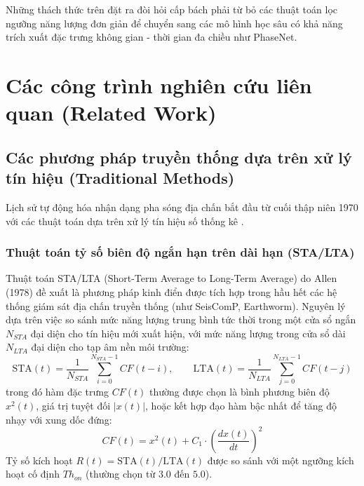 \documentclass[preprint,1p]{elsarticle}
\begin{document}
Những thách thức trên đặt ra đòi hỏi cấp bách phải từ bỏ các thuật toán lọc ngưỡng năng lượng đơn giản để chuyển sang các mô hình học sâu có khả năng trích xuất đặc trưng không gian - thời gian đa chiều như PhaseNet.

\section{Các công trình nghiên cứu liên quan (Related Work)}
\label{sec:related}

\subsection{Các phương pháp truyền thống dựa trên xử lý tín hiệu (Traditional Methods)}
\label{sec:related_trad}

Lịch sử tự động hóa nhận dạng pha sóng địa chấn bắt đầu từ cuối thập niên 1970 với các thuật toán dựa trên xử lý tín hiệu số thống kê \cite{allen1978automatic,baer1987automatic}.

\subsubsection{Thuật toán tỷ số biên độ ngắn hạn trên dài hạn (STA/LTA)}
Thuật toán STA/LTA (Short-Term Average to Long-Term Average) do Allen (1978) đề xuất \cite{allen1978automatic} là phương pháp kinh điển được tích hợp trong hầu hết các hệ thống giám sát địa chấn truyền thống (như SeisComP, Earthworm). Nguyên lý dựa trên việc so sánh mức năng lượng trung bình tức thời trong một cửa sổ ngắn $N_{STA}$ đại diện cho tín hiệu mới xuất hiện, với mức năng lượng trong cửa sổ dài $N_{LTA}$ đại diện cho tạp âm nền môi trường:
\begin{equation}
\text{STA}(t) = \frac{1}{N_{STA}} \sum_{i=0}^{N_{STA}-1} CF(t - i), \qquad \text{LTA}(t) = \frac{1}{N_{LTA}} \sum_{j=0}^{N_{LTA}-1} CF(t - j)
\label{eq:sta_lta_def}
\end{equation}
trong đó hàm đặc trưng $CF(t)$ thường được chọn là bình phương biên độ $x^2(t)$, giá trị tuyệt đối $|x(t)|$, hoặc kết hợp đạo hàm bậc nhất để tăng độ nhạy với xung dốc đứng:
\begin{equation}
CF(t) = x^2(t) + C_1 \cdot \left(\frac{dx(t)}{dt}\right)^2
\label{eq:cf_func}
\end{equation}
Tỷ số kích hoạt $R(t) = \text{STA}(t) / \text{LTA}(t)$ được so sánh với một ngưỡng kích hoạt cố định $Th_{on}$ (thường chọn từ $3.0$ đến $5.0$). 
\end{document}
